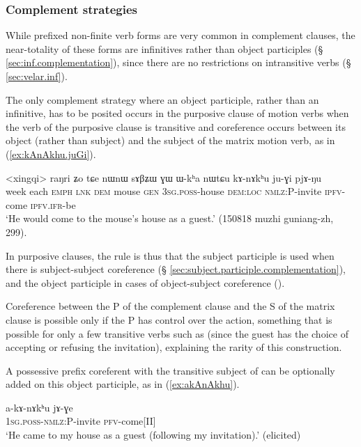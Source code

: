 \subsubsection{Complement strategies} \label{sec:object.participles.complement}
While  prefixed non-finite verb forms are very common in complement clauses, the near-totality of these forms are infinitives rather than object participles (§ \ref{sec:inf.complementation}), since there are no restrictions on intransitive verbs (§ \ref{sec:velar.inf}).

The only complement strategy where an object participle, rather than an infinitive, has to be posited occurs in the purposive clause of  motion verbs when the verb of the purposive clause is transitive and coreference occurs between its object (rather than subject) and the subject of the matrix motion verb, as  in (\ref{ex:kAnAkhu.juGi}).

\begin{exe}
\ex \label{ex:kAnAkhu.juGi}
\gll <xingqi> raŋri ʑo tɕe nɯnɯ sɤβʑɯ ɣɯ ɯ-kʰa nɯtɕu kɤ-nɤkʰu ju-ɣi pjɤ-ŋu  \\
week each \textsc{emph} \textsc{lnk} \textsc{dem} mouse \textsc{gen} \textsc{3sg.poss}-house \textsc{dem:loc} \textsc{nmlz:P}-invite \textsc{ipfv}-come \textsc{ipfv.ifr}-be \\
\glt `He would come to the mouse's house as a guest.' (150818 muzhi guniang-zh, 299).
\end{exe}

In purposive clauses, the rule is thus that the subject participle is used when there is subject-subject coreference (§ \ref{sec:subject.participle.complementation}), and the object participle in cases of object-subject coreference  (\citealt[248]{jacques16complementation}).
 
 Coreference between the P of the complement clause and the S of the matrix clause is possible only if the P has control over the action, something that is possible for only a few transitive verbs such as  (since the guest has the choice of accepting or refusing the invitation), explaining the rarity of this construction. 
 
 A possessive prefix coreferent with the transitive subject of  can be optionally added on this object participle, as in (\ref{ex:akAnAkhu}).

\begin{exe}
\ex \label{ex:akAnAkhu}
\gll a-kɤ-nɤkʰu jɤ-ɣe  \\
 \textsc{1sg.poss-nmlz:P}-invite \textsc{pfv}-come[II] \\
\glt `He came to my house as a guest (following my invitation).' (elicited)
\end{exe}
 
